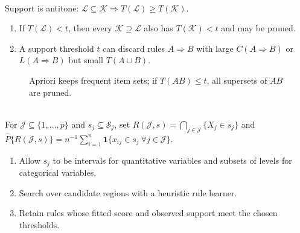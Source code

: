 \begin{remark} \label{rem:sl-apriori-monotonicity-and-limits} \\
Support is antitone: $\mathcal{L}\subseteq\mathcal{K}\Longrightarrow T(\mathcal{L})\geq T(\mathcal{K})$.
\begin{enumerate}[label=(\roman*)]
\setlength{\itemsep}{0pt}
\item If $T(\mathcal{L})<t$, then every $\mathcal{K}\supseteq\mathcal{L}$ also has $T(\mathcal{K})<t$ and may be pruned.
\item A support threshold $t$ can discard rules $A\Rightarrow B$ with large $C(A\Rightarrow B)$ or $L(A\Rightarrow B)$ but small $T(A\cup B)$.
\end{enumerate}
\end{remark}

\begin{figure}[H]
\centering

\caption{Apriori keeps \textcolor{green!55!black}{frequent item sets}; if \textcolor{red!70!black}{$T(AB)\le t$}, all supersets of $AB$ are pruned.}
\label{fig:sl-apriori-itemset-monotonicity}
\end{figure}

\begin{method} \label{meth:sl-generalized-association-rules} \\
For $\mathcal{J}\subseteq\{1,\ldots,p\}$ and $s_j\subseteq\mathcal{S}_j$, set $R(\mathcal{J},s)=\bigcap\limits_{j\in\mathcal{J}}\{X_j\in s_j\}$ and $\widehat{P}\{R(\mathcal{J},s)\}=n^{-1}\sum\limits_{i=1}^n\mathbf{1}\{x_{ij}\in s_j\ \forall j\in\mathcal{J}\}$.
\begin{enumerate}[label=(\roman*)]
\setlength{\itemsep}{0pt}
\item Allow $s_j$ to be intervals for quantitative variables and subsets of levels for categorical variables.
\item Search over candidate regions with a heuristic rule learner.
\item Retain rules whose fitted score and observed support meet the chosen thresholds.
\end{enumerate}
\end{method}

